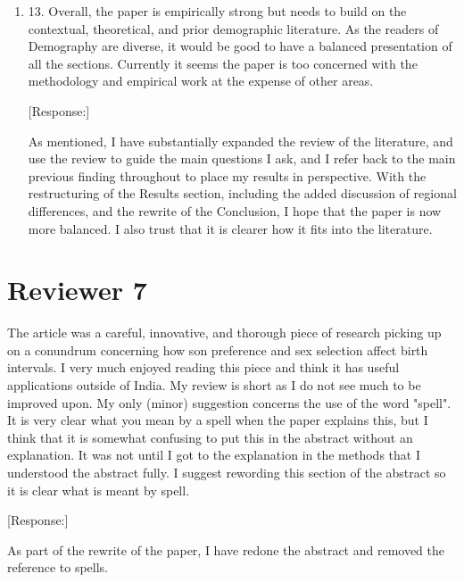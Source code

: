 \documentclass[letterpaper,12pt]{article}
\begin{document}
\begin{enumerate}
\item 13. Overall, the paper is empirically strong but needs to build on the
contextual, theoretical, and prior demographic literature. As the
readers of Demography are diverse, it would be good to have a balanced
presentation of all the sections. Currently it seems the paper is too
concerned with the methodology and empirical work at the expense of
other areas.

[Response:]

As mentioned, I have substantially expanded the review of the literature, and use the 
review to guide the main questions I ask, and I refer back to the main previous finding 
throughout to place my results in perspective.
With the restructuring of the Results section, including the added discussion of regional 
differences, and the rewrite of the Conclusion, I hope that the paper is now more 
balanced. 
I also trust that it is clearer how it fits into the literature.




\end{enumerate}

\newpage

\section*{Reviewer 7}

The article was a careful, innovative, and thorough piece of research
picking up on a conundrum concerning how son preference and sex
selection affect birth intervals. I very much enjoyed reading this piece
and think it has useful applications outside of India.  My review is
short as I do not see much to be improved upon.  My only (minor)
suggestion concerns the use of the word "spell".  It is very clear what
you mean by a spell when the paper explains this, but I think that it is
somewhat confusing to put this in the abstract without an explanation. 
It was not until I got to the explanation in the methods that I
understood the abstract fully.  I suggest rewording this section of the
abstract so it is clear what is meant by spell.

[Response:]

As part of the rewrite of the paper, I have redone the abstract and removed the
reference to spells.


\newpage


\end{document}
